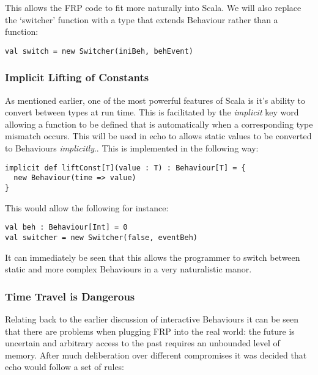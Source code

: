 \documentclass[12pt]{article}
\begin{document}
      This allows the FRP code to fit more naturally into Scala. We will also replace the `switcher' function
      with a type that extends Behaviour rather than a function:
      
\begin{verbatim}
val switch = new Switcher(iniBeh, behEvent)
\end{verbatim}

      \subsubsection{Implicit Lifting of Constants}
        As mentioned earlier, one of the most powerful features of Scala is it's ability to convert between
        types at run time. This is facilitated by the \emph{implicit} key word allowing a function to be defined
        that is automatically when a corresponding type mismatch occurs. This will be used in echo to allows 
        static values to be converted to Behaviours \emph{implicitly}.. This is implemented in the following way:  

\begin{verbatim}
implicit def liftConst[T](value : T) : Behaviour[T] = {
  new Behaviour(time => value)
}
\end{verbatim}              
        
        This would allow the following for instance:
 
\begin{verbatim}
val beh : Behaviour[Int] = 0
val switcher = new Switcher(false, eventBeh)
\end{verbatim}       

        It can immediately be seen that this allows the programmer to switch between static and more complex
        Behaviours in a very naturalistic manor.
      
      \subsubsection{Time Travel is Dangerous}
        Relating back to the earlier discussion of interactive Behaviours it can be seen
        that there are problems when plugging FRP into the real world: the future is uncertain and
        arbitrary access to the past requires an unbounded level of memory. After much deliberation
        over different compromises it was decided that echo would follow a set of rules:
        
\end{document}
